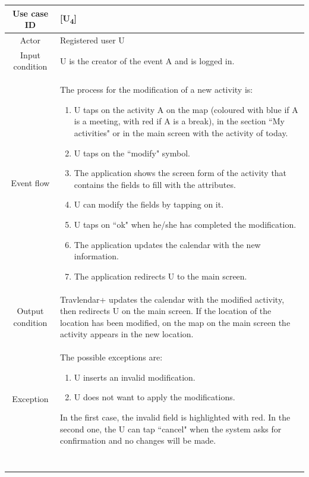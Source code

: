 \documentclass[12pt,titlepage]{article}
\begin{document}
\begin{tabular}{cp{11cm}} 
Use case ID& {[U\textsubscript{4}]}\\ \hline
Actor&Registered user U \\ \hline 
Input condition&U is the creator of the event A and is logged in.\\ \hline
Event flow&The process for the modification of a new activity is: \begin{enumerate}
\item U taps on the activity A on the map (coloured with blue if A is a meeting, with red if A is a break), in the section ``My activities" or in the main screen with the activity of today.
\item U taps on the ``modify" symbol.
\item The application shows the screen form of the activity that contains the fields to fill with the attributes.
\item U can modify the fields by tapping on it.
\item U taps on ``ok" when he/she has completed the modification.
\item The application updates the calendar with the new information.
\item The application redirects U to the main screen. 
\end{enumerate} \\ \hline
Output condition& Travlendar+ updates the calendar with the modified activity, then redirects U on the main screen. If the location of the location has been modified, on the map on the main screen the activity appears in the new location.
\\ \hline
Exception& The possible exceptions are:
\begin{enumerate}
\item U inserts an invalid modification.
\item U does not want to apply the modifications.
\end{enumerate} 
In the first case, the invalid field is highlighted with red. In the second one, the U can tap ``cancel" when the system asks for confirmation and no changes will be made.
\\ \hline \

\end{tabular}
\end{document}

